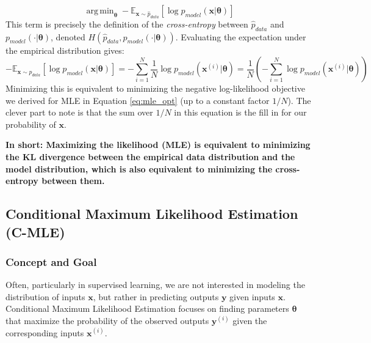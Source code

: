 \documentclass{article}
\DeclareMathOperator*{\argmin}{arg\,min}
\begin{document}
\begin{equation}
    \argmin_{\bm{\theta}} - \mathbb{E}_{\mathbf{x} \sim \hat{p}_{data}} [\log p_{model}(\mathbf{x} | \bm{\theta})]
\end{equation}
This term is precisely the definition of the \emph{cross-entropy} between $\hat{p}_{data}$ and $p_{model}(\cdot|\bm{\theta})$, denoted $H(\hat{p}_{data}, p_{model}(\cdot|\bm{\theta}))$. Evaluating the expectation under the empirical distribution gives:
\begin{equation}
    - \mathbb{E}_{\mathbf{x} \sim \hat{p}_{data}} [\log p_{model}(\mathbf{x} | \bm{\theta})] = - \sum_{i=1}^{N} \frac{1}{N} \log p_{model}(\mathbf{x}^{(i)} | \bm{\theta}) = \frac{1}{N} \left( -\sum_{i=1}^{N} \log p_{model}(\mathbf{x}^{(i)} | \bm{\theta}) \right)
\end{equation}
Minimizing this is equivalent to minimizing the negative log-likelihood objective we derived for MLE in Equation \ref{eq:mle_opt} (up to a constant factor $1/N$). The clever part to note is that the sum over $1/N$ in this equation is the fill in for our probability of $\mathbf{x}$. 

\textbf{In short: Maximizing the likelihood (MLE) is equivalent to minimizing the KL divergence between the empirical data distribution and the model distribution, which is also equivalent to minimizing the cross-entropy between them.}


\subsection{Conditional Maximum Likelihood Estimation (C-MLE)}

\subsubsection{Concept and Goal}
Often, particularly in supervised learning, we are not interested in modeling the distribution of inputs $\mathbf{x}$, but rather in predicting outputs $\mathbf{y}$ given inputs $\mathbf{x}$. Conditional Maximum Likelihood Estimation focuses on finding parameters $\bm{\theta}$ that maximize the probability of the observed outputs $\mathbf{y}^{(i)}$ given the corresponding inputs $\mathbf{x}^{(i)}$.
\end{document}
